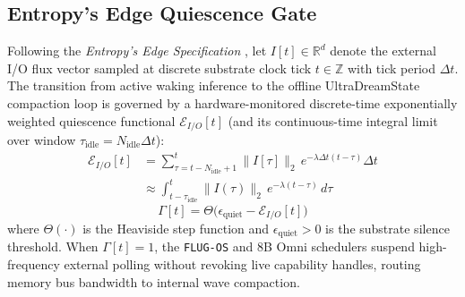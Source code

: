 \documentclass[10pt, twocolumn, a4paper]{article}
\begin{document}
\subsection{Entropy's Edge Quiescence Gate}
Following the \textit{Entropy's Edge Specification} \cite{guimond2026entropy}, let $I[t] \in \mathbb{R}^d$ denote the external I/O flux vector sampled at discrete substrate clock tick $t \in \mathbb{Z}$ with tick period $\Delta t$. The transition from active waking inference to the offline UltraDreamState compaction loop is governed by a hardware-monitored discrete-time exponentially weighted quiescence functional $\mathcal{E}_{I/O}[t]$ (and its continuous-time integral limit over window $\tau_{\text{idle}} = N_{\text{idle}} \Delta t$):
\begin{equation}
\begin{split}
\mathcal{E}_{I/O}[t] &= \sum_{\tau = t - N_{\text{idle}} + 1}^{t} \|I[\tau]\|_2 \, e^{-\lambda \Delta t (t - \tau)} \Delta t \\
&\approx \int_{t - \tau_{\text{idle}}}^{t} \|I(\tau)\|_2 \, e^{-\lambda(t - \tau)} \, d\tau
\end{split}
\label{eq:quiescence_energy}
\end{equation}
\begin{equation}
\Gamma[t] = \Theta\!\Big(\epsilon_{\text{quiet}} - \mathcal{E}_{I/O}[t]\Big)
\label{eq:quiescence_gate}
\end{equation}
where $\Theta(\cdot)$ is the Heaviside step function and $\epsilon_{\text{quiet}} > 0$ is the substrate silence threshold. When $\Gamma[t] = 1$, the \texttt{FLUG-OS} and 8B Omni schedulers suspend high-frequency external polling without revoking live capability handles, routing memory bus bandwidth to internal wave compaction.
\end{document}
